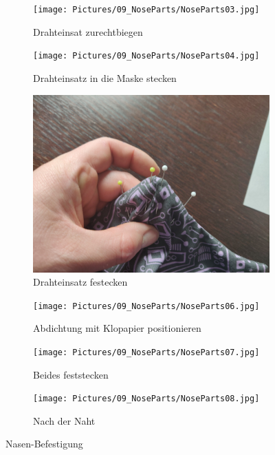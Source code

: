 \documentclass[12pt,parskip=full]{scrartcl}
\begin{document}
\begin{figure}[ht]
    \vspace{0.5cm}
    \centering
    \begin{subfigure}{0.48\textwidth}
        \centering
        \texttt{[image: Pictures/09\_NoseParts/NoseParts03.jpg]}
        \caption{Drahteinsat zurechtbiegen}
        \label{Nose03}
    \end{subfigure}
    \begin{subfigure}{0.48\textwidth}
        \centering
        \texttt{[image: Pictures/09\_NoseParts/NoseParts04.jpg]}
        \caption{Drahteinsatz in die Maske stecken}
        \label{Nose04}
    \end{subfigure}
    \begin{subfigure}{0.48\textwidth}
        \centering
        \includegraphics[width = \linewidth]{Pictures/09_NoseParts/NoseParts05.jpg}
        \caption{Drahteinsatz festecken}
        \label{Nose05}
    \end{subfigure}
    \begin{subfigure}{0.48\textwidth}
        \centering
        \texttt{[image: Pictures/09\_NoseParts/NoseParts06.jpg]}
        \caption{Abdichtung mit Klopapier positionieren}
        \label{Nose06}
    \end{subfigure}
    \begin{subfigure}{0.48\textwidth}
        \centering
        \texttt{[image: Pictures/09\_NoseParts/NoseParts07.jpg]}
        \caption{Beides feststecken}
        \label{Nose07}
    \end{subfigure}
    \begin{subfigure}{0.48\textwidth}
        \centering
        \texttt{[image: Pictures/09\_NoseParts/NoseParts08.jpg]}
        \caption{Nach der Naht}
        \label{Nose08}
    \end{subfigure}
    \caption{Nasen-Befestigung}
    \label{NoseMain}
\end{figure}
\end{document}
